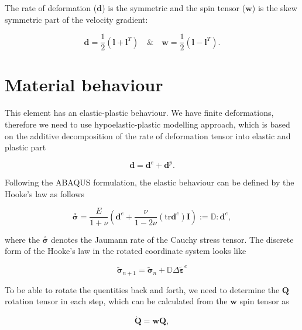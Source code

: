 \documentclass[12pt,a4paper]{article}
\begin{document}
The rate of deformation ($\boldsymbol{d}$) is the symmetric and the spin tensor ($\boldsymbol{w}$) is the skew symmetric part of the velocity gradient:

\begin{equation}
    \boldsymbol{d} = \frac{1}{2}(\boldsymbol{l}+\boldsymbol{l}^T) \quad\&\quad \boldsymbol{w} = \frac{1}{2}(\boldsymbol{l}-\boldsymbol{l}^T).
\end{equation}  

\section*{Material behaviour}

This element has an elastic-plastic behaviour. We have finite deformations, therefore we need to use hypoelastic-plastic modelling approach, which is based on the additive decomposition of the rate of deformation tensor into elastic and plastic part

\begin{equation}
    \boldsymbol{d} = \boldsymbol{d}^e + \boldsymbol{d}^p.
\end{equation}  

Following the ABAQUS formulation, the elastic behaviour can be defined by the Hooke's law as follows

\begin{equation}
    \overset{\circ}{\boldsymbol{\sigma}}  = \frac{E}{1+\nu}\left(\boldsymbol{d}^e+\frac{\nu}{1-2\nu}(\text{tr}\boldsymbol{d}^e)\boldsymbol{I}\right) := \mathbb{D} : \boldsymbol{d}^e,
\end{equation}

where the $\overset{\circ}{\boldsymbol{\sigma}}$ denotes the Jaumann rate of the Cauchy stress tensor. The discrete form of the Hooke's law in the rotated coordinate system looks like 

\begin{equation}
    \tilde{\boldsymbol{\sigma}}_{n+1}  = \tilde{\boldsymbol{\sigma}}_{n} + 
    \mathbb{D} \Delta\tilde{\boldsymbol{\varepsilon}}^e
\end{equation}

To be able to rotate the quentities back and forth, we need to determine the $\boldsymbol{Q}$ rotation tensor in each step, which can be calculated from the $\boldsymbol{w}$ spin tensor as

\begin{equation}
    \dot{\boldsymbol{Q}} = \boldsymbol{w}\boldsymbol{Q},
\end{equation}
\end{document}
